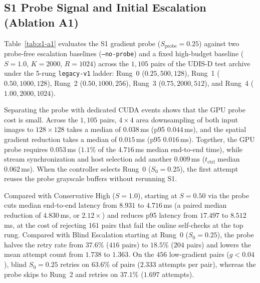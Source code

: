 \subsection{S1 Probe Signal and Initial Escalation (Ablation A1)}
\label{sec:s1-probe-ablation}
\begin{table}[t]
\centering
\caption{Ablation A1 on the UDIS-D test set ($1{,}105$ pairs, $512\times 512$ RGB)
on one NVIDIA Tesla T4, with 2 warmups and 10 measured repeats per pair.
Times are in milliseconds, summarized across per-pair medians.
$t_{\text{probe}}$ is the GPU time for $S_{\text{probe}}=0.25$ downsampling and
gradient reduction across both images; $t_{\text{ctrl}}$ includes stream
synchronization and host decision time.}
\label{tab:s1-a1}
\small

\end{table}
Table~\ref{tab:s1-a1} evaluates the S1 gradient probe ($S_{\text{probe}}=0.25$)
against two probe-free escalation baselines (\texttt{--no-probe}) and a fixed
high-budget baseline ($S=1.0$, $K=2000$, $R=1024$) across the $1{,}105$ pairs of
the UDIS-D test archive under the 5-rung \texttt{legacy-v1} ladder:
Rung~0 ($0.25, 500, 128$), Rung~1 ($0.50, 1000, 128$), Rung~2 ($0.50, 1000, 256$),
Rung~3 ($0.75, 2000, 512$), and Rung~4 ($1.00, 2000, 1024$).

Separating the probe with dedicated CUDA events shows that the GPU probe cost is
small. Across the $1{,}105$ pairs, $4\times 4$ area downsampling of both input
images to $128\times 128$ takes a median of $0.038$\,ms (p95 $0.044$\,ms), and
the spatial gradient reduction takes a median of $0.015$\,ms (p95 $0.016$\,ms).
Together, the GPU probe requires $0.053$\,ms ($1.1\%$ of the $4.716$\,ms median
end-to-end time), while stream synchronization and host selection add another
$0.009$\,ms ($t_{\text{ctrl}}$ median $0.062$\,ms). When the controller selects
Rung~0 ($S_0=0.25$), the first attempt reuses the probe grayscale buffers without
rerunning S1.

Compared with Conservative High ($S=1.0$), starting at $S=0.50$ via the probe
cuts median end-to-end latency from $8.931$ to $4.716$\,ms (a paired median
reduction of $4.830$\,ms, or $2.12\times$) and reduces p95 latency from $17.497$
to $8.512$\,ms, at the cost of rejecting $161$ pairs that fail the online
self-checks at the top rung. Compared with Blind Escalation starting at Rung~0
($S_0=0.25$), the probe halves the retry rate from $37.6\%$ ($416$ pairs) to
$18.5\%$ ($204$ pairs) and lowers the mean attempt count from $1.738$ to
$1.363$. On the $456$ low-gradient pairs ($g < 0.04$), blind $S_0=0.25$ retries
on $63.6\%$ of pairs ($2.333$ attempts per pair), whereas the probe skips to
Rung~2 and retries on $37.1\%$ ($1.697$ attempts).

